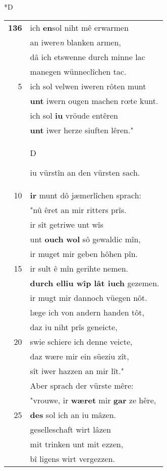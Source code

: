 \documentclass[8pt,a4paper,notitlepage]{article}
\begin{document}
\begin{table}[ht]
\begin{minipage}[t]{0.5\linewidth}
\small
\begin{center}*D
\end{center}
\begin{tabular}{rl}
\textbf{136} & ich \textbf{en}sol niht mê erwarmen\\ 
 & an iwere\textit{n} blanken armen,\\ 
 & dâ ich etswenne durch minne lac\\ 
 & manegen wünneclîchen tac.\\ 
5 & ich sol velwen iweren rôten munt\\ 
 & \textbf{unt} iwern ougen machen rœte kunt.\\ 
 & ich sol \textbf{iu} vröude entêren\\ 
 & \textbf{unt} iwer herze siuften lêren."\\ 
 & \begin{large}D\end{large}iu vürstîn an den vürsten sach.\\ 
10 & \textbf{ir} munt dô jæmerlîchen sprach:\\ 
 & "nû êret an mir ritters prîs.\\ 
 & ir sît getriwe unt wîs\\ 
 & unt \textbf{ouch} \textbf{wol} sô gewaldic mîn,\\ 
 & ir muget mir geben hôhen pîn.\\ 
15 & ir sult ê mîn gerihte nemen.\\ 
 & \textbf{durch elliu wîp lât iuch} gezemen.\\ 
 & ir mugt mir dannoch vüegen nôt.\\ 
 & læge ich von andern handen tôt,\\ 
 & daz iu niht prîs geneicte,\\ 
20 & swie schiere ich denne veicte,\\ 
 & daz wære mir ein süeziu zît,\\ 
 & sît iwer hazzen an mir lît."\\ 
 & Aber sprach der vürste mêre:\\ 
 & "vrouwe, ir \textbf{wæret} mir \textbf{gar} ze hêre,\\ 
25 & \textbf{des} sol ich an iu mâzen.\\ 
 & geselleschaft wirt lâzen\\ 
 & mit trinken unt mit ezzen,\\ 
 & bî ligens wirt vergezzen.\\ 

\end{tabular}
\end{minipage}
\end{table}
\end{document}
